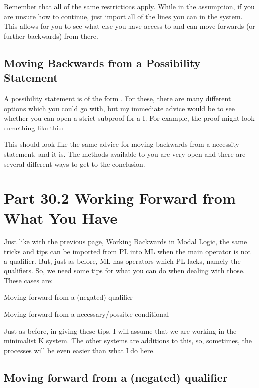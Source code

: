 Remember that all of the same restrictions apply. While in the assumption, if you are unsure how to continue, just import all of the lines you can in the system. This allows for you to see what else you have access to and can move forwards (or further backwards) from there.

\subsection{Moving Backwards from a Possibility Statement}

A possibility statement is of the form \ediamond {}. For these, there are many different options which you could go with, but my immediate advice would be to see whether you can open a strict subproof for a \ediamond I. For example, the proof might look something like this:

\begin{fitchproof}
\ellipsesline
{}			
\open
{}
\have[]{}{}
\ellipsesline
{}
\close
{}
\end{fitchproof}

This should look like the same advice for moving backwards from a necessity statement, and it is. The methods available to you are very open and there are several different ways to get to the conclusion.
\section{Part 30.2 Working Forward from What You Have}
Just like with the previous page, Working Backwards in Modal Logic, the same tricks and tips can be imported from PL into ML when the main operator is not a qualifier. But, just as before, ML has operators which PL lacks, namely the qualifiers. So, we need some tips for what you can do when dealing with those. These cases are:
\begin{ebullet}
\item[\textbullet] Moving forward from a (negated) qualifier
\item[\textbullet] Moving forward from a necessary/possible conditional
\end{ebullet}
Just as before, in giving these tips, I will assume that we are working in the minimalist K system. The other systems are additions to this, so, sometimes, the processes will be even easier than what I do here. 

\subsection{Moving forward from a (negated) qualifier}

